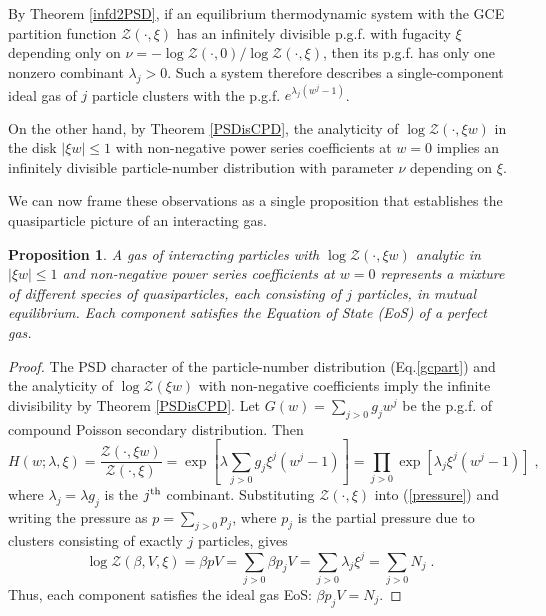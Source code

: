 \documentclass[a4paper,12pt]{amsart}
\newtheorem{Proposition}{Proposition}[section]
\theoremstyle{definition}
\theoremstyle{remark}
\begin{document}
By Theorem \ref{infd2PSD}, if an equilibrium thermodynamic system with the GCE partition function $\mathcal{Z}(\cdot,\xi)$  has an infinitely divisible p.g.f. with fugacity $\xi$ depending only on $\nu=- \log \mathcal{Z}(\cdot,0) /\log \mathcal{Z}(\cdot,\xi)$, then its p.g.f. has only one nonzero combinant $\lambda_j>0$. Such a system therefore describes a single-component ideal gas of $j$ particle clusters with the p.g.f. $e^{\lambda_j(w^j -1)}$.  

On the other hand, by Theorem \ref{PSDisCPD}, the analyticity of $\log \mathcal{Z}(\cdot, \xi w)$ in the disk $|\xi w|\leq 1$ with non-negative power series coefficients at $w=0$ implies an infinitely divisible particle-number distribution with parameter $\nu$ depending on $\xi$. 

We can now frame these observations as a single proposition that establishes the quasiparticle picture of an interacting gas.
\begin{Proposition}\label{cor:mixt}
A gas of interacting particles with $\log \mathcal{Z}(\cdot,\xi w)$ analytic in $|\xi w|\leq 1$ and non-negative power series coefficients at $w=0$ represents a mixture of different species of quasiparticles, each consisting of $j$ particles, in mutual equilibrium. Each component satisfies the {\it Equation of State} (EoS) of a perfect gas.   
\end{Proposition} 

\begin{proof}
The PSD character of the particle-number distribution (Eq.\ref{gcpart}) and the analyticity of $\log \mathcal{Z}(\xi w)$ with non-negative coefficients imply the infinite divisibility by Theorem \ref{PSDisCPD}. Let $G(w)=\sum_{j>0}g_j w^j$ be the p.g.f. of compound Poisson secondary distribution. Then
\[
 H(w;\lambda, \xi)=
 \frac{\mathcal{Z}(\cdot,\xi w)}{\mathcal{Z}(\cdot,\xi)}
 = \exp\left[\lambda \sum_{j>0}g_j \xi^j (w^j-1)\right] =\prod_{j>0}\exp\left[\lambda_j\xi^j(w^j-1)\right]\;,
\]
where $\lambda_j=\lambda g_j$ is the $j^{\rm th}$ combinant. Substituting  $\mathcal{Z}(\cdot,\xi)$ into (\ref{pressure}) and writing the pressure as $p=\sum_{j>0} p_j$, where $p_j$ is the partial pressure due to clusters consisting of exactly $j$ particles, gives
\begin{equation} \label{eq: clust}
\log \mathcal{Z}(\beta, V,\xi) =   \beta pV =  
\sum_{j>0}\beta p_jV  =\sum_{j>0} \lambda_j \xi^j =\sum_{j>0}N_j\;.
\end{equation}
 Thus, each component satisfies the ideal gas EoS: $\beta p_j V = N_j$.
\end{proof}
\end{document}
